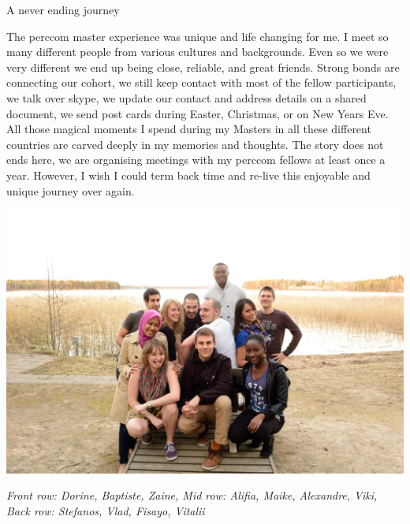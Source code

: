 \documentclass[10pt,a4paper]{article} %
\newcommand{\NewsItem}[1]{ %
\usefont{T1}{fvs}{n}{n} %
\vspace{24pt}\large #1\vspace{3pt} %
\par \normalsize \normalfont}
\begin{document}
\begin{multicols}{3}
\NewsItem{A never ending journey}

The {\sc perccom} master experience was unique and life changing for me. 
I meet so many different people from various cultures and backgrounds. 
Even so we were very different we end up being close, reliable, and great friends.
Strong bonds are connecting our cohort, we still keep contact with most of the 
fellow participants, we talk over skype, we update our contact and address details 
on a shared document, we send post cards during Easter, Christmas, 
or on New Years Eve.
All those magical moments I spend during my Masters in all these different countries 
are carved deeply in my memories and thoughts. 
The story does not ends here, we are organising meetings with my {\sc perccom} 
fellows at least once a year.
However, I wish I could term back time and re-live this enjoyable and 
unique journey over again. 
 


\end{multicols}


\begin{center}
	\vspace{10pt}
	\includegraphics[width=1\linewidth]{media/perccom_family.jpg} %
	\vspace{10pt}
		\par\textit{Front row: Dorine, Baptiste, Zaine, Mid row: Alifia, Maike, Alexandre, Viki, Back row: Stefanos, Vlad, Fisayo, Vitalii}
\end{center}
\end{document}
